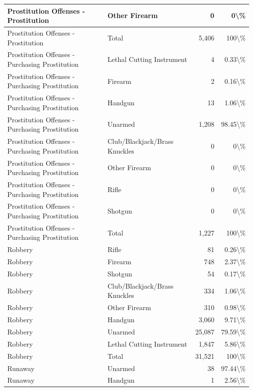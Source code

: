 \documentclass[
]{krantz}
\begin{document}
\begin{longtable}[t]{l|l|r|r}
\hline
Prostitution Offenses - Prostitution & Other Firearm & 0 & 0\textbackslash{}\%\\
\hline
Prostitution Offenses - Prostitution & Total & 5,406 & 100\textbackslash{}\%\\
\hline
Prostitution Offenses - Purchasing Prostitution & Lethal Cutting Instrument & 4 & 0.33\textbackslash{}\%\\
\hline
Prostitution Offenses - Purchasing Prostitution & Firearm & 2 & 0.16\textbackslash{}\%\\
\hline
Prostitution Offenses - Purchasing Prostitution & Handgun & 13 & 1.06\textbackslash{}\%\\
\hline
Prostitution Offenses - Purchasing Prostitution & Unarmed & 1,208 & 98.45\textbackslash{}\%\\
\hline
Prostitution Offenses - Purchasing Prostitution & Club/Blackjack/Brass Knuckles & 0 & 0\textbackslash{}\%\\
\hline
Prostitution Offenses - Purchasing Prostitution & Other Firearm & 0 & 0\textbackslash{}\%\\
\hline
Prostitution Offenses - Purchasing Prostitution & Rifle & 0 & 0\textbackslash{}\%\\
\hline
Prostitution Offenses - Purchasing Prostitution & Shotgun & 0 & 0\textbackslash{}\%\\
\hline
Prostitution Offenses - Purchasing Prostitution & Total & 1,227 & 100\textbackslash{}\%\\
\hline
Robbery & Rifle & 81 & 0.26\textbackslash{}\%\\
\hline
Robbery & Firearm & 748 & 2.37\textbackslash{}\%\\
\hline
Robbery & Shotgun & 54 & 0.17\textbackslash{}\%\\
\hline
Robbery & Club/Blackjack/Brass Knuckles & 334 & 1.06\textbackslash{}\%\\
\hline
Robbery & Other Firearm & 310 & 0.98\textbackslash{}\%\\
\hline
Robbery & Handgun & 3,060 & 9.71\textbackslash{}\%\\
\hline
Robbery & Unarmed & 25,087 & 79.59\textbackslash{}\%\\
\hline
Robbery & Lethal Cutting Instrument & 1,847 & 5.86\textbackslash{}\%\\
\hline
Robbery & Total & 31,521 & 100\textbackslash{}\%\\
\hline
Runaway & Unarmed & 38 & 97.44\textbackslash{}\%\\
\hline
Runaway & Handgun & 1 & 2.56\textbackslash{}\%\\

\end{longtable}
\end{document}
